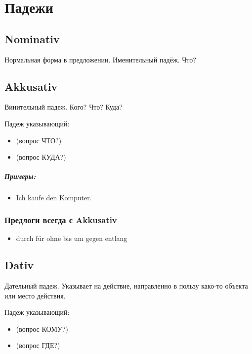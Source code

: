 \chapter{Падежи}

\section{Nominativ}

Нормальная форма в предложении. Именительный падёж. Что?

\section{Akkusativ}

Винительный падеж. Кого? Что? Куда?

Падеж указывающий:
\begin{itemize}
 \item {} (вопрос ЧТО?)
 \item {} (вопрос КУДА?)
\end{itemize}

\paragraph{Примеры:}
\begin{itemize}
\item Ich kaufe den Komputer.
~\\ 
\end{itemize}

\subsection{Предлоги всегда с Akkusativ}
\begin{itemize}
\item  durch für ohne bis um gegen entlang 
\end{itemize}

\section{Dativ}

Дательный падеж. Указывает на действие, направленно в пользу како-то объекта или место действия.

Падеж указывающий:
\begin{itemize}
 \item {} (вопрос КОМУ?)
 \item {} (вопрос ГДЕ?)
\end{itemize}

